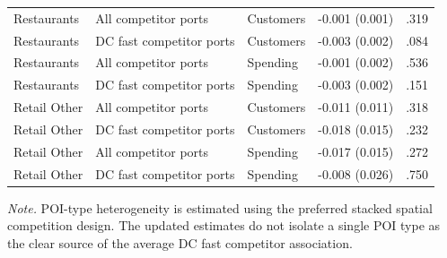 \begin{table}[!htbp]
\begin{tabular}{lllll}
Restaurants & All competitor ports & Customers & -0.001 (0.001) & .319 \\
Restaurants & DC fast competitor ports & Customers & -0.003 (0.002) & .084 \\
Restaurants & All competitor ports & Spending & -0.001 (0.002) & .536 \\
Restaurants & DC fast competitor ports & Spending & -0.003 (0.002) & .151 \\
Retail Other & All competitor ports & Customers & -0.011 (0.011) & .318 \\
Retail Other & DC fast competitor ports & Customers & -0.018 (0.015) & .232 \\
Retail Other & All competitor ports & Spending & -0.017 (0.015) & .272 \\
Retail Other & DC fast competitor ports & Spending & -0.008 (0.026) & .750 \\
\bottomrule
\end{tabular}
\begin{minipage}{0.95\linewidth}\footnotesize\emph{Note.} POI-type heterogeneity is estimated using the preferred stacked spatial competition design. The updated estimates do not isolate a single POI type as the clear source of the average DC fast competitor association.\end{minipage}
\end{table}
